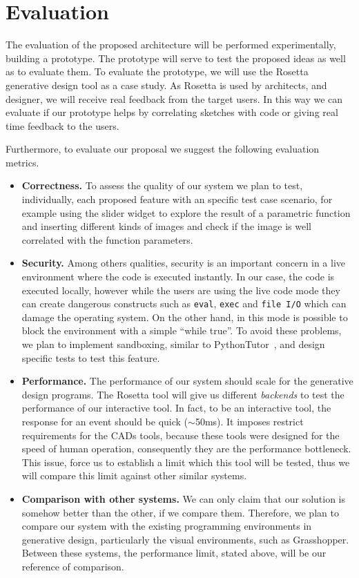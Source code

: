 
% 
% 
\section{Evaluation}
\label{sec:eval}

The evaluation of the proposed architecture will be performed experimentally, building a prototype. The prototype will serve to test the proposed ideas as well as to evaluate them. To evaluate the prototype, we will use the Rosetta~\cite{lopes2011portable} generative design tool as a case study. As Rosetta is used by architects, and designer, we will receive real feedback from the target users. In this way we can evaluate if our prototype helps by correlating sketches with code or giving real time feedback to the users.

Furthermore, to evaluate our proposal we suggest the following evaluation metrics.

\begin{itemize}
\item \textbf{Correctness.} To assess the quality of our system we plan to test, individually, each proposed feature with an specific test case scenario, for example using the slider widget to explore the result of a parametric function and inserting different kinds of images and check if the image is well correlated with the function parameters. 

\item \textbf{Security.} Among others qualities, security is an important concern in a live environment where the code is executed instantly. In our case, the code is executed locally, however while the users are using the live code mode they can create dangerous constructs such as \texttt{eval}, \texttt{exec} and \texttt{file I/O} which can damage the operating system. On the other hand, in this mode is possible to block the environment with a simple ``while true''. To avoid these problems, we plan to implement sandboxing, similar to PythonTutor~\cite{GuoSIGCSE2013}, and design specific tests to test this feature.

\item \textbf{Performance.} The performance of our system should scale for the generative design programs. The Rosetta tool will give us different \textit{backends} to test the performance of our interactive tool. In fact, to be an interactive tool, the response for an event should be quick ($\sim$50ms). It imposes restrict requirements for the CADs tools, because these tools were designed for the speed of human operation, consequently they are the performance bottleneck. This issue, force us to establish a limit which this tool will be tested, thus we will compare this limit against other similar systems.

\item \textbf{Comparison with other systems.} We can only claim that our solution is somehow better than the other, if we compare them. Therefore, we plan to compare our system with the existing programming environments in generative design, particularly the visual environments, such as Grasshopper. Between these systems, the performance limit, stated above, will be our reference of comparison.
\end{itemize}